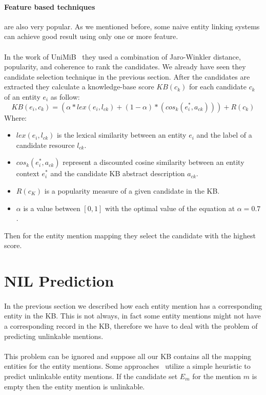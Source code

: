 \paragraph{Feature based techniques} are also very popular. As we mentioned before, some naive entity linking systems can achieve good result using only one or more feature.
\paragraph{} In the work of UniMiB~\cite{caliano2016unimib} they used a combination of Jaro-Winkler distance, popularity, and  coherence to rank the candidates. We already have seen they candidate selection technique in the previous section. After the candidates are extracted they calculate a knowledge-base score $KB(c_k)$ for each candidate $c_k$ of an entity $e_i$ as follow: \[KB(e_i, c_k) = (\alpha * lex(e_i, l_{ck}) + (1 - \alpha) * (cos_k(e^{*}_{i}, a_{ck}))) + R(c_k)\]
Where:

\begin{itemize}[noitemsep,  topsep=10pt]
\item $lex(e_i, l_{ck})$ is the lexical similarity between an entity $e_i$ and the label of a candidate resource $l_{ck}$.
\item $cos_k(e^{*}_{i}, a_{ck})$ represent a discounted cosine similarity between an entity context $e^{*}_{i}$ and the candidate KB abstract description $a_{ck}$.
\item $R(c_K)$ is a popularity measure of a given candidate in the KB.
\item $\alpha$ is a value between $[0, 1]$ with the optimal value of the equation at $\alpha = 0.7$.
\end{itemize}

Then for the entity mention mapping they select the candidate with the highest score.

\section{NIL Prediction}
\paragraph{}
In the previous section we described how each entity mention has a corresponding entity in the KB. This is not always, in fact some entity mentions might not have a corresponding record in the KB, therefore we have to deal with the problem of predicting unlinkable mentions.
\paragraph{}
This problem can be ignored and suppose all our KB contains all the mapping entities for the entity mentions. Some approaches~\cite{cucerzan2007large} utilize a simple heuristic to predict unlinkable entity mentions. If the candidate set $E_m$ for the mention $m$ is empty then the entity mention is unlinkable.
